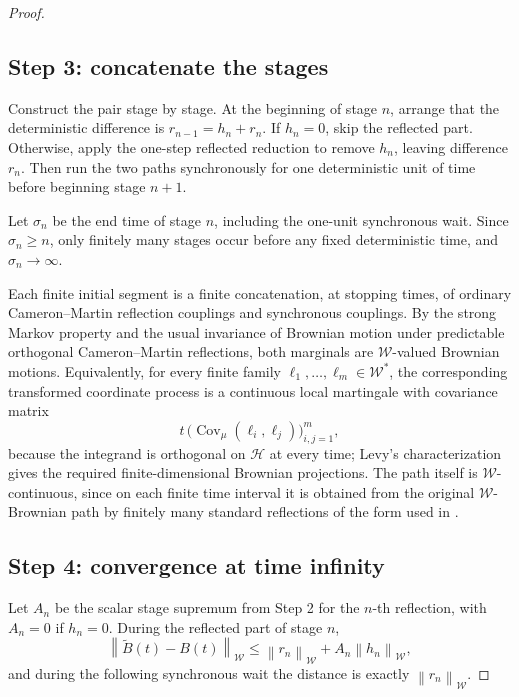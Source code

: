 \documentclass[11pt]{article}
\newcommand{\W}{\mathcal W}
\newcommand{\HH}{\mathcal H}
\newcommand{\norm}[1]{\left\lVert #1 \right\rVert}
\begin{document}
\begin{proof}
\subsection*{Step 3: concatenate the stages}

Construct the pair stage by stage.  At the beginning of stage \(n\), arrange
that the deterministic difference is \(r_{n-1}=h_n+r_n\).  If \(h_n=0\), skip
the reflected part.  Otherwise, apply the one-step reflected reduction to
remove \(h_n\), leaving difference \(r_n\).  Then run the two paths
synchronously for one deterministic unit of time before beginning stage
\(n+1\).

Let \(\sigma_n\) be the end time of stage \(n\), including the one-unit
synchronous wait.  Since \(\sigma_n\ge n\), only finitely many stages occur
before any fixed deterministic time, and \(\sigma_n\to\infty\).

Each finite initial segment is a finite concatenation, at stopping times, of
ordinary Cameron--Martin reflection couplings and synchronous couplings.  By
the strong Markov property and the usual invariance of Brownian motion under
predictable orthogonal Cameron--Martin reflections, both marginals are
\(\W\)-valued Brownian motions.  Equivalently, for every finite family
\(\ell_1,\ldots,\ell_m\in\W^*\), the corresponding transformed coordinate
process is a continuous local martingale with covariance matrix
\[
        t\,
        \big(\operatorname{Cov}_\mu(\ell_i,\ell_j)\big)_{i,j=1}^m ,
\]
because the integrand is orthogonal on \(\HH\) at every time; Levy's
characterization gives the required finite-dimensional Brownian projections.
The path itself is \(\W\)-continuous, since on each finite time interval it is
obtained from the original \(\W\)-Brownian path by finitely many standard
reflections of the form used in \cite{CandelleroKendall2017}.

\subsection*{Step 4: convergence at time infinity}

Let \(A_n\) be the scalar stage supremum from Step 2 for the \(n\)-th
reflection, with \(A_n=0\) if \(h_n=0\).  During the reflected part of stage
\(n\),
\[
        \norm{\widetilde B(t)-B(t)}_{\W}
        \le \norm{r_n}_{\W}+ A_n\norm{h_n}_{\W},
\]
and during the following synchronous wait the distance is exactly
\(\norm{r_n}_{\W}\).


\end{proof}
\end{document}
